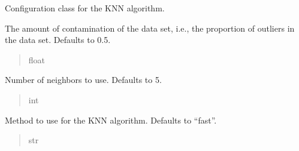 \documentclass[letterpaper,10pt,english]{sphinxmanual}
\begin{document}
\begin{fulllineitems}
\sphinxAtStartPar
Configuration class for the KNN algorithm.

\begin{fulllineitems}
\label{\detokenize{application.algorithms.knn:application.algorithms.knn.KnnConfiguration.KnnConfiguration.contamination}}
\pysigstartsignatures
{}
\pysigstopsignatures
\sphinxAtStartPar
The amount of contamination of the data set, i.e., the proportion of outliers in the data set. Defaults to 0.5.
\begin{quote}\begin{description}
\sphinxAtStartPar
float

\end{description}\end{quote}

\end{fulllineitems}


\begin{fulllineitems}
\label{\detokenize{application.algorithms.knn:application.algorithms.knn.KnnConfiguration.KnnConfiguration.n_neighbors}}
\pysigstartsignatures
{}
\pysigstopsignatures
\sphinxAtStartPar
Number of neighbors to use. Defaults to 5.
\begin{quote}\begin{description}
\sphinxAtStartPar
int

\end{description}\end{quote}

\end{fulllineitems}


\begin{fulllineitems}
\label{\detokenize{application.algorithms.knn:application.algorithms.knn.KnnConfiguration.KnnConfiguration.method}}
\pysigstartsignatures
{}
\pysigstopsignatures
\sphinxAtStartPar
Method to use for the KNN algorithm. Defaults to “fast”.
\begin{quote}\begin{description}
\sphinxAtStartPar
str


\end{description}
\end{quote}
\end{fulllineitems}
\end{fulllineitems}
\end{document}
